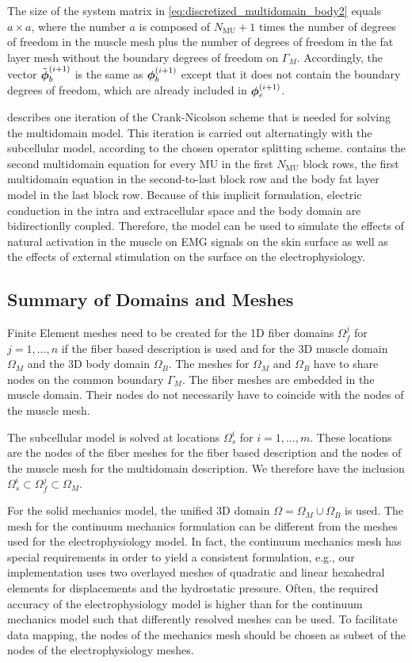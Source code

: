 The size of the system matrix in \cref{eq:discretized_multidomain_body2} equals $a\times a$, where the number $a$ is composed of $N_\text{MU}+1$ times the number of degrees of freedom in the muscle mesh plus the number of degrees of freedom in the fat layer mesh without the boundary degrees of freedom on $\Gamma_M$. Accordingly, the vector $\tilde{\boldsymbol{\phi}}_b^{(i+1)}$ is the same as $\boldsymbol{\phi}_b^{(i+1)}$ except that it does not contain the boundary degrees of freedom, which are already included in $\boldsymbol{\phi}_e^{(i+1)}$.

 describes one iteration of the Crank-Nicolson scheme that is needed for solving the multidomain model. This iteration is carried out alternatingly with the subcellular model, according to the chosen operator splitting scheme.  contains the second multidomain equation for every MU in the first $N_\text{MU}$ block rows, the first multidomain equation in the second-to-last block row and the body fat layer model in the last block row. Because of this implicit formulation, electric conduction in the intra and extracellular space and the body domain are bidirectionlly coupled. Therefore, the model can be used to simulate the effects of natural activation in the muscle on EMG signals on the skin surface as well as the effects of external stimulation on the surface on the electrophysiology.

\subsection{Summary of Domains and Meshes}

Finite Element meshes need to be created for the 1D fiber domains $\Omega_f^j$ for $j=1,\dots,n$ if the fiber based description is used and for the 3D muscle domain $\Omega_M$ and the 3D body domain $\Omega_B$. The meshes for $\Omega_M$ and $\Omega_B$ have to share nodes on the common boundary $\Gamma_M$. The fiber meshes are embedded in the muscle domain. Their nodes do not necessarily have to coincide with the nodes of the muscle mesh.

The subcellular model is solved at locations $\Omega_s^i$ for $i=1,\dots,m$. These locations are the nodes of the fiber meshes for the fiber based description and the nodes of the muscle mesh for the multidomain description. We therefore have the inclusion $\Omega_s^i \subset \Omega_f^j \subset \Omega_M$.

For the solid mechanics model, the unified 3D domain $\Omega = \Omega_M \cup \Omega_B$ is used. The mesh for the continuum mechanics formulation can be different from the meshes used for the electrophysiology model. In fact, the continuum mechanics mesh has special requirements in order to yield a consistent formulation, e.g., our implementation uses two overlayed meshes of quadratic and linear hexahedral elements for displacements and the hydrostatic pressure. Often, the required accuracy of the electrophysiology model is higher than for the continuum mechanics model such that differently resolved meshes can be used. To facilitate data mapping, the nodes of the mechanics mesh should be chosen as subset of the nodes of the electrophysiology meshes.


